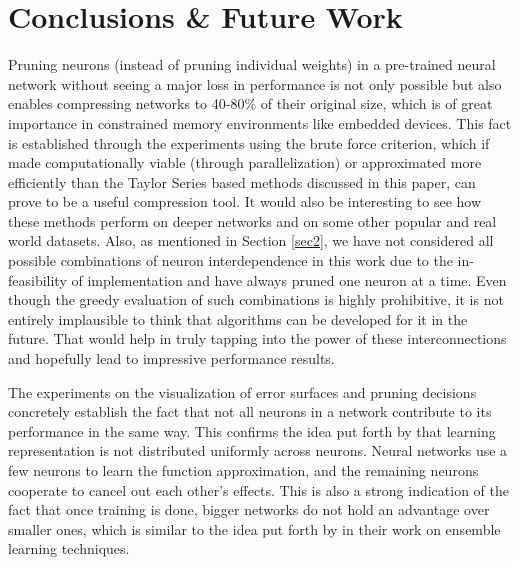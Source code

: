 \section{Conclusions \& Future Work}
Pruning neurons (instead of pruning individual weights) in a pre-trained neural network without seeing a major loss in performance is not only possible but also enables compressing networks to 40-80\% of their original size, which is of great importance in constrained memory environments like embedded devices. This fact is established through the experiments using the brute force criterion, which if made computationally viable (through parallelization) or approximated more efficiently than the Taylor Series based methods discussed in this paper, can prove to be a useful compression tool. It would also be interesting to see how these methods perform on deeper networks and on some other popular and real world datasets. Also, as mentioned in Section \ref{sec2}, we have not considered all possible combinations of neuron interdependence in this work due to the in-feasibility of implementation and have always pruned one neuron at a time. Even though the greedy evaluation of such combinations is highly prohibitive, it is not entirely implausible to think that algorithms can be developed for it in the future. That would help in truly tapping into the power of these interconnections and hopefully lead to impressive performance results.

The experiments on the visualization of error surfaces and pruning decisions concretely establish the fact that not all neurons in a network contribute to its performance in the same way. This confirms the idea put forth by \cite{mozer1989using} that learning representation is not distributed uniformly across neurons. Neural networks use a few neurons to learn the function approximation, and the remaining neurons cooperate to cancel out each other's effects. This is also a strong indication of the fact that once training is done, bigger networks do not hold an advantage over smaller ones, which is similar to the idea put forth by \cite{darkknowledge2015} in their work on ensemble learning techniques.

